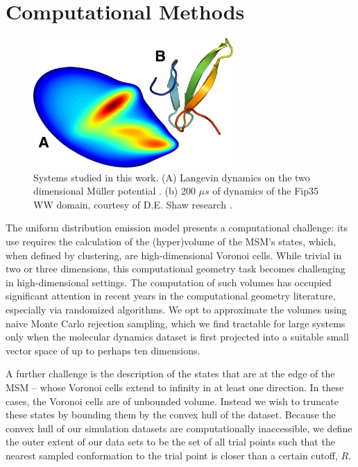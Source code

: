 \documentclass[journal=jpcbfk, layout=twocolumn, manuscript=article]{achemso}
\begin{document}
\section{Computational Methods}

\begin{figure}
\centering
\includegraphics[width=3in]{figs_final/mull_ww.png}
\caption{Systems studied in this work. (A) Langevin dynamics on the two dimensional M\"{u}ller potential \cite{Muller1980Reaction}. (b) 200 $\mu s$ of dynamics of the Fip35 WW domain\cite{Liu2008Experimental}, courtesy of D.E. Shaw research \cite{Shaw2010Atomic}.}
\end{figure}

The uniform distribution emission model presents a computational challenge: its use requires the calculation of the (hyper)volume of the MSM's states, which, when defined by clustering, are high-dimensional Voronoi cells. While trivial in two or three dimensions, this computational geometry task becomes challenging in high-dimensional settings. The computation of such volumes has occupied significant attention in recent years in the computational geometry literature, especially via randomized algorithms\cite{Kannan97, Simonovits03, Lovasz03}. We opt to approximate the volumes using naive Monte Carlo rejection sampling, which we find tractable for large systems only when the molecular dynamics dataset is first projected into a suitable small vector space of up to perhaps ten dimensions.

A further challenge is the description of the states that are at the edge of the MSM -- whose Voronoi cells extend to infinity in at least one direction. In these cases, the Voronoi cells are of unbounded volume. Instead we wish to truncate these states by bounding them by the convex hull of the dataset. Because the convex hull of our simulation datasets are computationally inaccessible, we define the outer extent of our data sets to be the set of all trial points such that the nearest sampled conformation to the trial point is closer than a certain cutoff, $R$.
\end{document}
